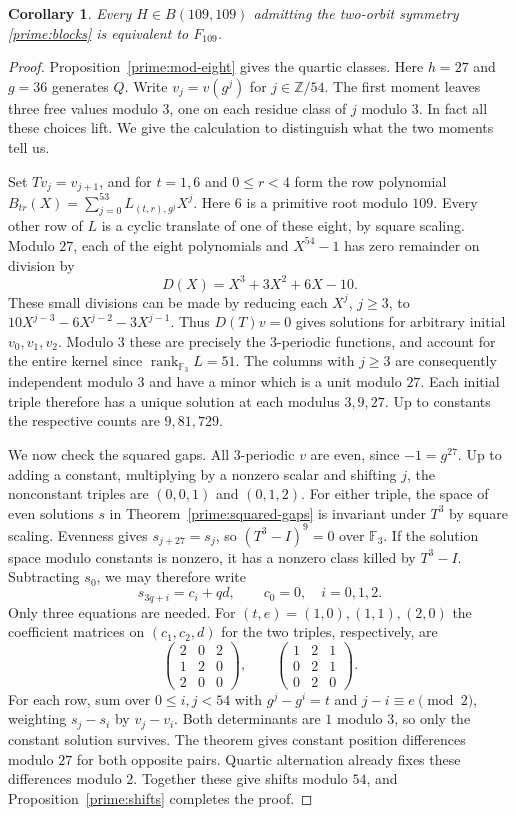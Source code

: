 \documentclass[11pt,a4paper]{article}
\newtheorem{corollary}[theorem]{Corollary}
\numberwithin{equation}{section}
\begin{document}
\begin{corollary}\label{prime:109}
Every $H\in B(109,109)$ admitting the two-orbit symmetry \eqref{prime:blocks} is equivalent to $F_{109}$.
\end{corollary}
\begin{proof}
Proposition~\ref{prime:mod-eight} gives the quartic classes. Here $h=27$ and $g=36$ generates $Q$. Write $v_j=v(g^j)$ for $j\in\mathbb Z/54$. The first moment leaves three free values modulo $3$, one on each residue class of $j$ modulo $3$. In fact all these choices lift. We give the calculation to distinguish what the two moments tell us.

Set $T v_j=v_{j+1}$, and for $t=1,6$ and $0\le r<4$ form the row polynomial $B_{tr}(X)=\sum_{j=0}^{53}L_{(t,r),g^j}X^j$. Here $6$ is a primitive root modulo $109$. Every other row of $L$ is a cyclic translate of one of these eight, by square scaling. Modulo $27$, each of the eight polynomials and $X^{54}-1$ has zero remainder on division by
$$D(X)=X^3+3X^2+6X-10.$$
These small divisions can be made by reducing each $X^j$, $j\ge3$, to $10X^{j-3}-6X^{j-2}-3X^{j-1}$. Thus $D(T)v=0$ gives solutions for arbitrary initial $v_0,v_1,v_2$. Modulo $3$ these are precisely the $3$-periodic functions, and account for the entire kernel since $\operatorname{rank}_{\mathbb F_3}L=51$. The columns with $j\ge3$ are consequently independent modulo $3$ and have a minor which is a unit modulo $27$. Each initial triple therefore has a unique solution at each modulus $3,9,27$. Up to constants the respective counts are $9,81,729$.

We now check the squared gaps. All $3$-periodic $v$ are even, since $-1=g^{27}$. Up to adding a constant, multiplying by a nonzero scalar and shifting $j$, the nonconstant triples are $(0,0,1)$ and $(0,1,2)$. For either triple, the space of even solutions $s$ in Theorem~\ref{prime:squared-gaps} is invariant under $T^3$ by square scaling. Evenness gives $s_{j+27}=s_j$, so $(T^3-I)^9=0$ over $\mathbb F_3$. If the solution space modulo constants is nonzero, it has a nonzero class killed by $T^3-I$. Subtracting $s_0$, we may therefore write
$$s_{3q+i}=c_i+qd,\qquad c_0=0,\quad i=0,1,2.$$
Only three equations are needed. For $(t,e)=(1,0),(1,1),(2,0)$ the coefficient matrices on $(c_1,c_2,d)$ for the two triples, respectively, are
\[
 \begin{pmatrix}2&0&2\\1&2&0\\2&0&0\end{pmatrix},
 \qquad
 \begin{pmatrix}1&2&1\\0&2&1\\0&2&0\end{pmatrix}.
\]
For each row, sum over $0\le i,j<54$ with $g^j-g^i=t$ and $j-i\equiv e\pmod2$, weighting $s_j-s_i$ by $v_j-v_i$. Both determinants are $1$ modulo $3$, so only the constant solution survives. The theorem gives constant position differences modulo $27$ for both opposite pairs. Quartic alternation already fixes these differences modulo $2$. Together these give shifts modulo $54$, and Proposition~\ref{prime:shifts} completes the proof.
\end{proof}
\end{document}
